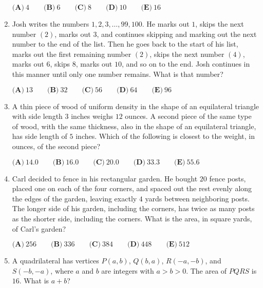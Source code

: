 \documentclass{article}
\begin{document}
\begin{enumerate}[label=\arabic*., itemsep=0.5em]
\(\textbf{(A)}\ 4\qquad\textbf{(B)}\ 6\qquad\textbf{(C)}\ 8\qquad\textbf{(D)}\ 10\qquad\textbf{(E)}\ 16\)\par \vspace{0.5em}\item Josh writes the numbers \(1,2,3,\dots,99,100\). He marks out \(1\), skips the next number \((2)\), marks out \(3\), and continues skipping and marking out the next number to the end of the list. Then he goes back to the start of his list, marks out the first remaining number \((2)\), skips the next number \((4)\), marks out \(6\), skips \(8\), marks out \(10\), and so on to the end. Josh continues in this manner until only one number remains. What is that number?

\(\textbf{(A)}\ 13 \qquad
\textbf{(B)}\ 32 \qquad
\textbf{(C)}\ 56 \qquad
\textbf{(D)}\ 64 \qquad
\textbf{(E)}\ 96\)\par \vspace{0.5em}\item A thin piece of wood of uniform density in the shape of an equilateral triangle with side length \(3\) inches weighs \(12\) ounces. A second piece of the same type of wood, with the same thickness, also in the shape of an equilateral triangle, has side length of \(5\) inches. Which of the following is closest to the weight, in ounces, of the second piece?

\(\textbf{(A)}\ 14.0\qquad\textbf{(B)}\ 16.0\qquad\textbf{(C)}\ 20.0\qquad\textbf{(D)}\ 33.3\qquad\textbf{(E)}\ 55.6\)\par \vspace{0.5em}\item Carl decided to fence in his rectangular garden. He bought \(20\) fence posts, placed one on each of the four corners, and spaced out the rest evenly along the edges of the garden, leaving exactly \(4\) yards between neighboring posts. The longer side of his garden, including the corners, has twice as many posts as the shorter side, including the corners. What is the area, in square yards, of Carl's garden?

\(\textbf{(A)}\ 256\qquad\textbf{(B)}\ 336\qquad\textbf{(C)}\ 384\qquad\textbf{(D)}\ 448\qquad\textbf{(E)}\ 512\)\par \vspace{0.5em}\item A quadrilateral has vertices \(P(a,b)\), \(Q(b,a)\), \(R(-a, -b)\), and \(S(-b, -a)\), where \(a\) and \(b\) are integers with \(a>b>0\). The area of \(PQRS\) is \(16\). What is \(a+b\)?


\end{enumerate}
\end{document}
